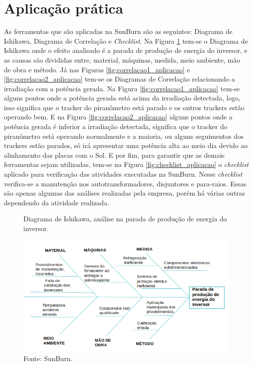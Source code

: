 \section{Aplicação prática}
\label{sec:controle_estatistico_aplicacao}
As ferramentas que são aplicadas na SunBurn são as seguintes: Diagrama de Ishikawa, Diagrama de Correlação e \textit{Checklist}.
Na Figura \ref{fig:ishikawa_aplicacao} tem-se o Diagrama de Ishikawa onde o efeito analisado é a parada de produção de energia do inversor, e as causas são divididas entre, material, máquinas, medida, meio ambiente, mão de obra e método.
Já nas Figuras \ref{fig:correlacao1_aplicacao} e \ref{fig:correlacao2_aplicacao} tem-se os Diagramas de Correlação relacionando a irradiação com a potência gerada. Na Figura \ref{fig:correlacao1_aplicacao} tem-se alguns pontos onde a potência gerada está acima da irradiação detectada, logo, isso significa que o tracker do piranômetro está parado e os outros trackers estão operando bem.
E na Figura \ref{fig:correlacao2_aplicacao} alguns pontos onde a potência gerada é inferior a irradiação detectada, significa que o tracker do piranômetro está operando normalmente e a maioria, ou alguns seguimentos dos trackers estão parados, só irá apresentar uma potência alta ao meio dia devido ao alinhamento das placas com o Sol.  
E por fim, para garantir que as demais ferramentas sejam utilizadas, tem-se na Figura \ref{fig:checklist_aplicacao} o \textit{checklist} aplicado para verificação das atividades executadas na SunBurn. Nesse \textit{checklist} verifica-se a manutenção nos autotransformadores, disjuntores e para-raios. Essas são apenas algumas das análises realizadas pela empresa, porém há várias outras dependendo da atividade realizada.

\begin{figure}[H]
    \caption{Diagrama de Ishikawa, análise na parada de produção de energia do inversor.} %
    \includegraphics[width=1\textwidth]{images/ishikawa_aplicacao.png}
    \caption*{Fonte: SunBurn.}
    \label{fig:ishikawa_aplicacao}
  \end{figure}

